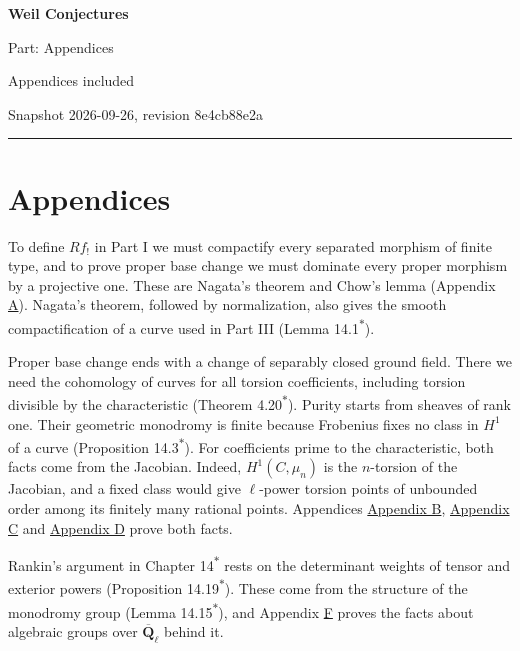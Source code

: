 \documentclass[11pt]{article}
\newcommand{\bpout}[1]{#1\textsuperscript{\hyperlink{bp-outside}{\ensuremath{\ast}}}}
\begin{document}
\pagestyle{plain}
\begin{center}
{\LARGE\bfseries Weil Conjectures\par}
\vspace{0.7em}
{\large Part: Appendices\par}
\vspace{0.5em}
{\small\color{bpmuted}Appendices included\par}
{\small\color{bpmuted}Snapshot 2026-09-26, revision 8e4cb88e2a\par}
\end{center}
\vspace{0.5em}
{\small\tableofcontents}
\bigskip\hrule\bigskip

\part*{\texorpdfstring{Appendices}{Appendices}}
\label{bp1}%
\label{bp2}%
To define \(Rf_!\) in Part I we must compactify every separated morphism of finite type, and to prove proper base change we must dominate every proper morphism by a projective one. These are Nagata's theorem and Chow's lemma (Appendix \hyperref[bp3]{A}). Nagata's theorem, followed by normalization, also gives the smooth compactification of a curve used in Part III (Lemma \bpout{14.1}).

Proper base change ends with a change of separably closed ground field. There we need the cohomology of curves for all torsion coefficients, including torsion divisible by the characteristic (Theorem \bpout{4.20}). Purity starts from sheaves of rank one. Their geometric monodromy is finite because Frobenius fixes no class in \(H^1\) of a curve (Proposition \bpout{14.3}). For coefficients prime to the characteristic, both facts come from the Jacobian. Indeed, \(H^1(C,\mu_n)\) is the \(n\)-torsion of the Jacobian, and a fixed class would give \(\ell\)-power torsion points of unbounded order among its finitely many rational points. Appendices \hyperref[bp75]{Appendix B}, \hyperref[bp119]{Appendix C} and \hyperref[bp172]{Appendix D} prove both facts.

Rankin's argument in Chapter \bpout{14} rests on the determinant weights of tensor and exterior powers (Proposition \bpout{14.19}). These come from the structure of the monodromy group (Lemma \bpout{14.15}), and Appendix \hyperref[bp318]{F} proves the facts about algebraic groups over \(\overline{\mathbf Q}_\ell\) behind it.
\end{document}
